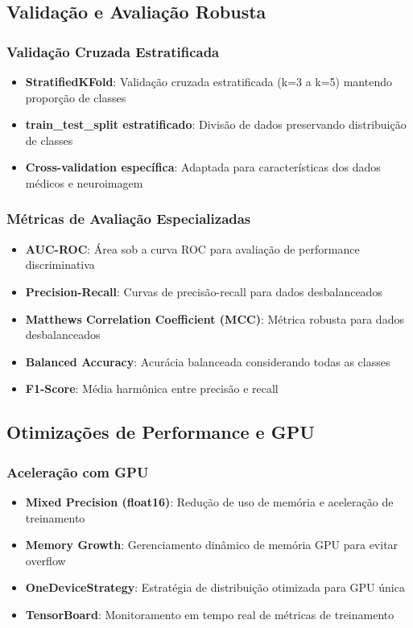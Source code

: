 \subsection{Validação e Avaliação Robusta}

\subsubsection{Validação Cruzada Estratificada}
\begin{itemize}
    \item \textbf{StratifiedKFold}: Validação cruzada estratificada (k=3 a k=5) mantendo proporção de classes
    \item \textbf{train\_test\_split estratificado}: Divisão de dados preservando distribuição de classes
    \item \textbf{Cross-validation específica}: Adaptada para características dos dados médicos e neuroimagem
\end{itemize}

\subsubsection{Métricas de Avaliação Especializadas}
\begin{itemize}
    \item \textbf{AUC-ROC}: Área sob a curva ROC para avaliação de performance discriminativa
    \item \textbf{Precision-Recall}: Curvas de precisão-recall para dados desbalanceados
    \item \textbf{Matthews Correlation Coefficient (MCC)}: Métrica robusta para dados desbalanceados
    \item \textbf{Balanced Accuracy}: Acurácia balanceada considerando todas as classes
    \item \textbf{F1-Score}: Média harmônica entre precisão e recall
\end{itemize}

\subsection{Otimizações de Performance e GPU}

\subsubsection{Aceleração com GPU}
\begin{itemize}
    \item \textbf{Mixed Precision (float16)}: Redução de uso de memória e aceleração de treinamento
    \item \textbf{Memory Growth}: Gerenciamento dinâmico de memória GPU para evitar overflow
    \item \textbf{OneDeviceStrategy}: Estratégia de distribuição otimizada para GPU única
    \item \textbf{TensorBoard}: Monitoramento em tempo real de métricas de treinamento
\end{itemize}

